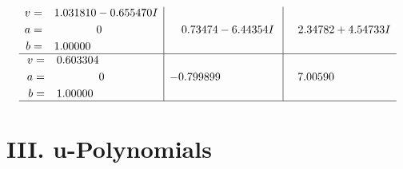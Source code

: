 \documentclass[1p]{elsarticle_modified}
\theoremstyle{definition}
\begin{document}
$$\begin{array}{c|c|c}
\begin{aligned}
v &= \phantom{-}1.031810 - 0.655470 I \\
a &= \phantom{-0.000000 } 0 \\
b &= \phantom{-}1.00000\phantom{ +0.000000I}\end{aligned}
 & \phantom{-}0.73474 - 6.44354 I & \phantom{-}2.34782 + 4.54733 I \\ \hline\begin{aligned}
v &= \phantom{-}0.603304\phantom{ +0.000000I} \\
a &= \phantom{-0.000000 } 0 \\
b &= \phantom{-}1.00000\phantom{ +0.000000I}\end{aligned}
 & -0.799899\phantom{ +0.000000I} & \phantom{-}7.00590\phantom{ +0.000000I}\\
 \hline 
 \end{array}$$\newpage
\newpage\renewcommand{\arraystretch}{1}
\centering \section*{ III. u-Polynomials}
\end{document}
